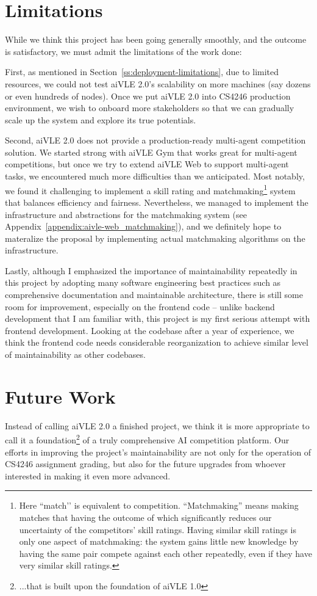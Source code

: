 \section{Limitations}
\label{s:conclusion-limitations}
While we think this project has been going generally smoothly, and the outcome is satisfactory, we must admit the limitations of the work done:

First, as mentioned in Section~\ref{ss:deployment-limitations}, due to limited resources, we could not test aiVLE 2.0's scalability on more machines (say dozens or even hundreds of nodes). Once we put aiVLE 2.0 into CS4246 production environment, we wish to onboard more stakeholders so that we can gradually scale up the system and explore its true potentials.

Second, aiVLE 2.0 does not provide a production-ready multi-agent competition solution. We started strong with aiVLE Gym that works great for multi-agent competitions, but once we try to extend aiVLE Web to support multi-agent tasks, we encountered much more difficulties than we anticipated. Most notably, we found it challenging to implement a skill rating and matchmaking\footnote{Here ``match’’ is equivalent to competition. ``Matchmaking'' means making matches that having the outcome of which significantly reduces our uncertainty of the competitors' skill ratings. Having similar skill ratings is only one aspect of matchmaking: the system gains little new knowledge by having the same pair compete against each other repeatedly, even if they have very similar skill ratings.} system that balances efficiency and fairness. Nevertheless, we managed to implement the infrastructure and abstractions for the matchmaking system (see Appendix~\ref{appendix:aivle-web_matchmaking}), and we definitely hope to materalize the proposal by implementing actual matchmaking algorithms on the infrastructure.

Lastly, although I emphasized the importance of maintainability repeatedly in this project by adopting many software engineering best practices such as comprehensive documentation and maintainable architecture, there is still some room for improvement, especially on the frontend code – unlike backend development that I am familiar with, this project is my first serious attempt with frontend development. Looking at the codebase after a year of experience, we think the frontend code needs considerable reorganization to achieve similar level of maintainability as other codebases.

\section{Future Work}
\label{s:conclusion-future_work}
Instead of calling aiVLE 2.0 a finished project, we think it is more appropriate to call it a foundation\footnote{...that is built upon the foundation of aiVLE 1.0} of a truly comprehensive AI competition platform. Our efforts in improving the project's maintainability are not only for the operation of CS4246 assignment grading, but also for the future upgrades from whoever interested in making it even more advanced.

